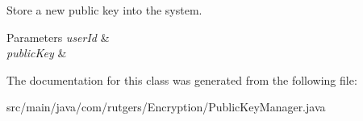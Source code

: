 Store a new public key into the system. 
\begin{DoxyParams}{Parameters}
{\em user\+Id} & \\
\hline
{\em public\+Key} & \\
\hline
\end{DoxyParams}


The documentation for this class was generated from the following file\+:\begin{DoxyCompactItemize}
\item 
src/main/java/com/rutgers/\+Encryption/Public\+Key\+Manager.\+java\end{DoxyCompactItemize}
